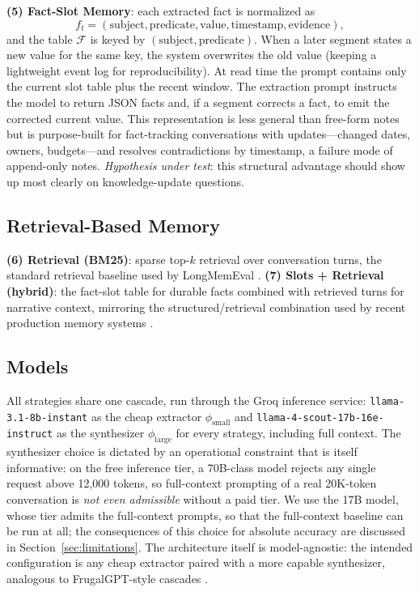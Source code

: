 \documentclass[conference]{IEEEtran}
\begin{document}
\textbf{(5) Fact-Slot Memory}: each extracted fact is normalized as
\begin{equation}
f_t = (\text{subject}, \text{predicate}, \text{value}, \text{timestamp}, \text{evidence}),
\end{equation}
and the table $\mathcal{F}$ is keyed by $(\text{subject}, \text{predicate})$. When a later segment states a new value for the same key, the system overwrites the old value (keeping a lightweight event log for reproducibility). At read time the prompt contains only the current slot table plus the recent window. The extraction prompt instructs the model to return JSON facts and, if a segment corrects a fact, to emit the corrected current value. This representation is less general than free-form notes but is purpose-built for fact-tracking conversations with updates---changed dates, owners, budgets---and resolves contradictions by timestamp, a failure mode of append-only notes. \emph{Hypothesis under test}: this structural advantage should show up most clearly on knowledge-update questions.

\subsection{Retrieval-Based Memory}
\textbf{(6) Retrieval (BM25)}: sparse top-$k$ retrieval over conversation turns, the standard retrieval baseline used by LongMemEval \cite{wu2024longmemeval}. \textbf{(7) Slots + Retrieval (hybrid)}: the fact-slot table for durable facts combined with retrieved turns for narrative context, mirroring the structured/retrieval combination used by recent production memory systems \cite{chhikara2025mem0}.

\subsection{Models}
\label{sec:models}
All strategies share one cascade, run through the Groq inference service: \texttt{llama-3.1-8b-instant} as the cheap extractor $\phi_{\text{small}}$ and \texttt{llama-4-scout-17b-16e-instruct} as the synthesizer $\phi_{\text{large}}$ for every strategy, including full context. The synthesizer choice is dictated by an operational constraint that is itself informative: on the free inference tier, a 70B-class model rejects any single request above 12{,}000 tokens, so full-context prompting of a real 20K-token conversation is \emph{not even admissible} without a paid tier. We use the 17B model, whose tier admits the full-context prompts, so that the full-context baseline can be run at all; the consequences of this choice for absolute accuracy are discussed in Section~\ref{sec:limitations}. The architecture itself is model-agnostic: the intended configuration is any cheap extractor paired with a more capable synthesizer, analogous to FrugalGPT-style cascades \cite{chen2023frugalgpt}.
\end{document}
